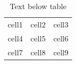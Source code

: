 \documentclass[12pt, a4paper]{article} %
\begin{document}
\setlength{\tabcolsep}{20pt} %
\renewcommand{\arraystretch}{1.5} %

\begin{center}

\begin{table}[H]

\centering

\begin{tabular}{ |l|c|r| } %
\hline                     %
cell1 & cell2 & cell3 \\   %
cell4 & cell5 & cell6 \\
cell7 & cell8 & cell9 \\
\hline                     %
\end{tabular}

\caption{Text below table}
\label{table:sample_table_label}
\end{table}

\end{center}
\end{document}
